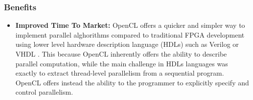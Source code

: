 \subsubsection{Benefits}

\begin{itemize}
	\item \textbf{Improved Time To Market:} OpenCL offers a quicker and simpler way to implement parallel alghorithms  compared to traditional FPGA development using lower level hardware description language (HDLs) such as Verilog or VHDL \cite {altera:FPGA}.  This because OpenCL inherently offers the ability to describe parallel computation, while the main challenge in HDLs languages was exactly to extract thread-level parallelism from a sequential program. OpenCL offers instead the ability to the programmer to explicitly specify and control parallelism.
\end{itemize}





